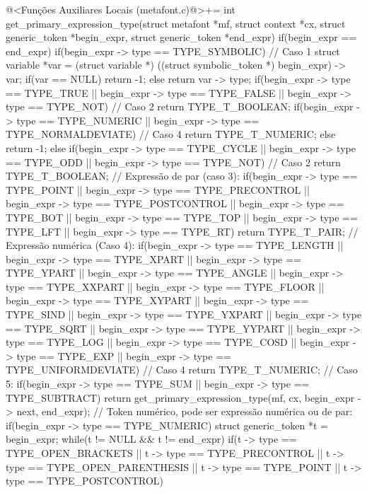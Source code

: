 {{{{{{\iniciocodigo
@<Funções Auxiliares Locais (metafont.c)@>+=
int get_primary_expression_type(struct metafont *mf, struct context *cx,
                               struct generic_token *begin_expr,
                               struct generic_token *end_expr){
  if(begin_expr == end_expr){
    if(begin_expr -> type == TYPE_SYMBOLIC){ // Caso 1
      struct variable *var = (struct variable *)
                               ((struct symbolic_token *) begin_expr) -> var;
      if(var == NULL)
        return -1;
      else
        return var -> type;
    }
    if(begin_expr -> type == TYPE_TRUE || begin_expr -> type == TYPE_FALSE ||
       begin_expr -> type == TYPE_NOT) // Caso 2
      return TYPE_T_BOOLEAN;
    if(begin_expr -> type == TYPE_NUMERIC ||
       begin_expr -> type == TYPE_NORMALDEVIATE) // Caso 4
      return TYPE_T_NUMERIC;
    else
      return -1;
  }
  else{
    if(begin_expr -> type == TYPE_CYCLE || begin_expr -> type == TYPE_ODD ||
       begin_expr -> type == TYPE_NOT) // Caso 2
      return TYPE_T_BOOLEAN;
    // Expressão de par (caso 3):
    if(begin_expr -> type == TYPE_POINT ||
       begin_expr -> type == TYPE_PRECONTROL ||
       begin_expr -> type == TYPE_POSTCONTROL ||
       begin_expr -> type == TYPE_BOT || begin_expr -> type == TYPE_TOP ||
       begin_expr -> type == TYPE_LFT || begin_expr -> type == TYPE_RT)
      return TYPE_T_PAIR;    
    // Expressão numérica (Caso 4):
    if(begin_expr -> type == TYPE_LENGTH || begin_expr -> type == TYPE_XPART ||
       begin_expr -> type == TYPE_YPART || begin_expr -> type == TYPE_ANGLE ||
       begin_expr -> type == TYPE_XXPART || begin_expr -> type == TYPE_FLOOR ||
       begin_expr -> type == TYPE_XYPART || begin_expr -> type == TYPE_SIND ||
       begin_expr -> type == TYPE_YXPART || begin_expr -> type == TYPE_SQRT ||
       begin_expr -> type == TYPE_YYPART || begin_expr -> type == TYPE_LOG ||
       begin_expr -> type == TYPE_COSD ||   begin_expr -> type == TYPE_EXP ||
       begin_expr -> type == TYPE_UNIFORMDEVIATE) // Caso 4
      return TYPE_T_NUMERIC;
    // Caso 5:
    if(begin_expr -> type == TYPE_SUM || begin_expr -> type == TYPE_SUBTRACT)
      return get_primary_expression_type(mf, cx, begin_expr -> next, end_expr);
    // Token numérico, pode ser expressão numérica ou de par:
    if(begin_expr -> type == TYPE_NUMERIC){
      struct generic_token *t = begin_expr;
      while(t != NULL && t != end_expr){
        if(t -> type == TYPE_OPEN_BRACKETS || t -> type == TYPE_PRECONTROL ||
           t -> type == TYPE_OPEN_PARENTHESIS || t -> type == TYPE_POINT ||
           t -> type == TYPE_POSTCONTROL)
}}}}}}}}}}
